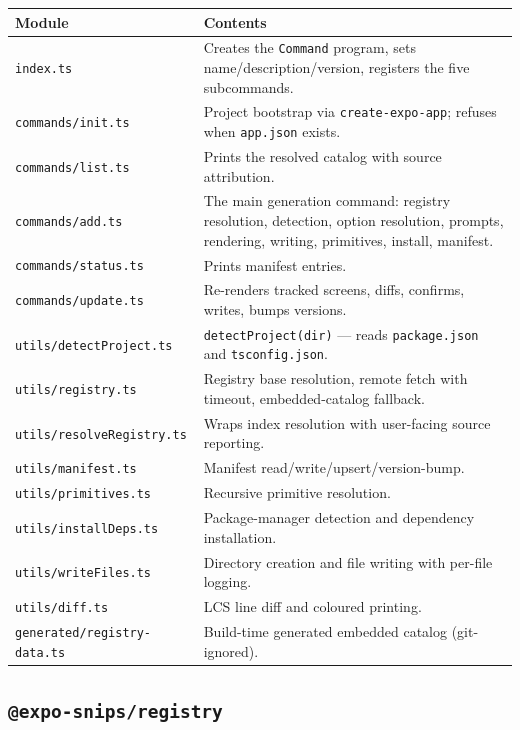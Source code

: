 \begin{longtable}{p{4.2cm}p{9.8cm}}
\toprule
\textbf{Module} & \textbf{Contents} \\
\midrule
\endhead
\texttt{index.ts} & Creates the \texttt{Command} program, sets name/description/version, registers the five subcommands. \\
\texttt{commands/init.ts} & Project bootstrap via \texttt{create-expo-app}; refuses when \texttt{app.json} exists. \\
\texttt{commands/list.ts} & Prints the resolved catalog with source attribution. \\
\texttt{commands/add.ts} & The main generation command: registry resolution, detection, option resolution, prompts, rendering, writing, primitives, install, manifest. \\
\texttt{commands/status.ts} & Prints manifest entries. \\
\texttt{commands/update.ts} & Re-renders tracked screens, diffs, confirms, writes, bumps versions. \\
\texttt{utils/detectProject.ts} & \texttt{detectProject(dir)} --- reads \texttt{package.json} and \texttt{tsconfig.json}. \\
\texttt{utils/registry.ts} & Registry base resolution, remote fetch with timeout, embedded-catalog fallback. \\
\texttt{utils/resolveRegistry.ts} & Wraps index resolution with user-facing source reporting. \\
\texttt{utils/manifest.ts} & Manifest read/write/upsert/version-bump. \\
\texttt{utils/primitives.ts} & Recursive primitive resolution. \\
\texttt{utils/installDeps.ts} & Package-manager detection and dependency installation. \\
\texttt{utils/writeFiles.ts} & Directory creation and file writing with per-file logging. \\
\texttt{utils/diff.ts} & LCS line diff and coloured printing. \\
\texttt{generated/registry-data.ts} & Build-time generated embedded catalog (git-ignored). \\
\bottomrule
\end{longtable}

\subsection*{\texttt{@expo-snips/registry}}

